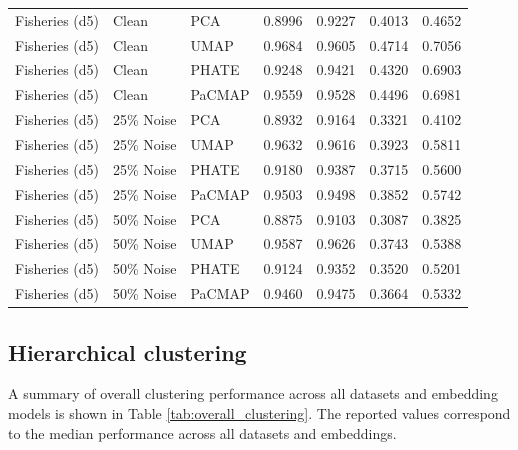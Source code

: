 \begin{table}[t]
\begin{tabular}{lllcccc}
    Fisheries (d5) & Clean & PCA & 0.8996 & 0.9227 & 0.4013 & 0.4652 \\
    Fisheries (d5) & Clean & UMAP & 0.9684 & 0.9605 & 0.4714 & 0.7056 \\
    Fisheries (d5) & Clean & PHATE & 0.9248 & 0.9421 & 0.4320 & 0.6903 \\
    Fisheries (d5) & Clean & PaCMAP & 0.9559 & 0.9528 & 0.4496 & 0.6981 \\
    
    Fisheries (d5) & 25\% Noise & PCA & 0.8932 & 0.9164 & 0.3321 & 0.4102 \\
    Fisheries (d5) & 25\% Noise & UMAP & 0.9632 & 0.9616 & 0.3923 & 0.5811 \\
    Fisheries (d5) & 25\% Noise & PHATE & 0.9180 & 0.9387 & 0.3715 & 0.5600 \\
    Fisheries (d5) & 25\% Noise & PaCMAP & 0.9503 & 0.9498 & 0.3852 & 0.5742 \\
    
    Fisheries (d5) & 50\% Noise & PCA & 0.8875 & 0.9103 & 0.3087 & 0.3825 \\
    Fisheries (d5) & 50\% Noise & UMAP & 0.9587 & 0.9626 & 0.3743 & 0.5388 \\
    Fisheries (d5) & 50\% Noise & PHATE & 0.9124 & 0.9352 & 0.3520 & 0.5201 \\
    Fisheries (d5) & 50\% Noise & PaCMAP & 0.9460 & 0.9475 & 0.3664 & 0.5332 \\
    
    \bottomrule
    \end{tabular}
    \end{table}

\subsection{Hierarchical clustering}

A summary of overall clustering performance across all datasets and embedding models is shown in Table \ref{tab:overall_clustering}. The reported values correspond to the median performance across all datasets and embeddings.

